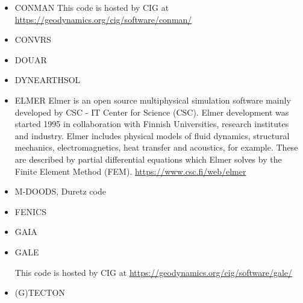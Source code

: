 \begin{itemize}


\item CONMAN
This code is hosted by CIG at \url{https://geodynamics.org/cig/software/conman/}

\cite{kirh90}
\cite{itki94}
\cite{kian95}
\cite{kian98}
\cite{itki98}
\cite{befo99}
\cite{nake07}
\cite{dadh07}
\cite{kifr15}


\item CONVRS 
\cite{yoth12}
\cite{yosh13} 
 



\item DOUAR

\cite{brtf08}
\cite{thfb08}
\cite{yahb09}
\cite{brya10}
\cite{lobh10}
\cite{mutg13}
\cite{whbb14}
\cite{neew18}
\cite{koen19}

\item DYNEARTHSOL
\cite{chtl13}


\item ELMER
Elmer is an open source multiphysical simulation software mainly developed by 
CSC - IT Center for Science (CSC). Elmer development was started 1995 in collaboration with 
Finnish Universities, research institutes and industry. Elmer includes physical models of 
fluid dynamics, structural mechanics, electromagnetics, heat transfer and acoustics, 
for example. These are described by partial differential equations which Elmer solves 
by the Finite Element Method (FEM). \url{https://www.csc.fi/web/elmer}

\cite{mals14}


\item M-DOODS, Duretz code
\cite{yatd12}
\cite{yahb13}
\cite{chmd19}

\item FENICS
\cite{alrk14}


\item GAIA

\cite{hutm13}

\item GALE

This code is hosted by CIG at \url{https://geodynamics.org/cig/software/gale/}

\cite{fabs08}
\cite{gotc08}
\cite{beve10}
\cite{cmwt10}
\cite{lehm12}\cite{liqi12}
\cite{arbi13}

\item (G)TECTON


\end{itemize}
